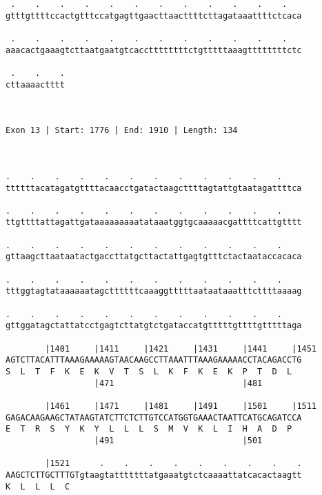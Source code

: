 \documentclass{article}
\begin{document}
\begin{Verbatim}
 .    .    .    .    .    .    .    .    .    .    .    .   
gtttgttttccactgtttccatgagttgaacttaacttttcttagataaattttctcaca
                                                            
 .    .    .    .    .    .    .    .    .    .    .    .   
aaacactgaaagtcttaatgaatgtcaccttttttttctgtttttaaagttttttttctc
                                                            
 .    .    .
cttaaaactttt
            
            
 
Exon 13 | Start: 1776 | End: 1910 | Length: 134



.    .    .    .    .    .    .    .    .    .    .    .    
ttttttacatagatgttttacaacctgatactaagcttttagtattgtaatagattttca
                                                            
.    .    .    .    .    .    .    .    .    .    .    .    
ttgttttattagattgataaaaaaaaatataaatggtgcaaaaacgattttcattgtttt
                                                            
.    .    .    .    .    .    .    .    .    .    .    .    
gttaagcttaataatactgaccttatgcttactattgagtgtttctactaataccacaca
                                                            
.    .    .    .    .    .    .    .    .    .    .    .    
tttggtagtataaaaaatagcttttttcaaaggtttttaataataaatttcttttaaaag
                                                            
.    .    .    .    .    .    .    .    .    .    .    .    
gttggatagctattatcctgagtcttatgtctgataccatgtttttgttttgtttttaga
                                                            
        |1401     |1411     |1421     |1431     |1441     |1451
AGTCTTACATTTAAAGAAAAAGTAACAAGCCTTAAATTTAAAGAAAAACCTACAGACCTG
S  L  T  F  K  E  K  V  T  S  L  K  F  K  E  K  P  T  D  L  
                  |471                          |481        
  
        |1461     |1471     |1481     |1491     |1501     |1511
GAGACAAGAAGCTATAAGTATCTTCTCTTGTCCATGGTGAAACTAATTCATGCAGATCCA
E  T  R  S  Y  K  Y  L  L  L  S  M  V  K  L  I  H  A  D  P  
                  |491                          |501        
  
        |1521      .    .    .    .    .    .    .    .    .
AAGCTCTTGCTTTGTgtaagtatttttttatgaaatgtctcaaaattatcacactaagtt
K  L  L  L  C                                               
                                                            

\end{Verbatim}
\end{document}
